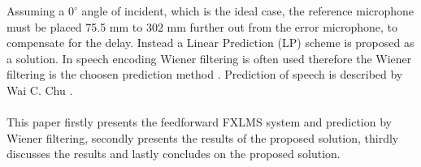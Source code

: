 Assuming a $\text{0}^{\circ}$ angle of incident, which is the ideal case, the reference microphone must be placed 75.5 mm to 302 mm further out from the error microphone, to compensate for the delay. Instead a Linear Prediction (LP) scheme is proposed as a solution. In speech encoding Wiener filtering is often used therefore the Wiener filtering is the choosen prediction method \cite{Speech}.
Prediction of speech is described by Wai C. Chu \cite{Speech}. 
\\\\
This paper firstly presents the feedforward FXLMS system and prediction by Wiener filtering, secondly presents the results of the proposed solution, thirdly discusses the results and lastly concludes on the proposed solution.
        







